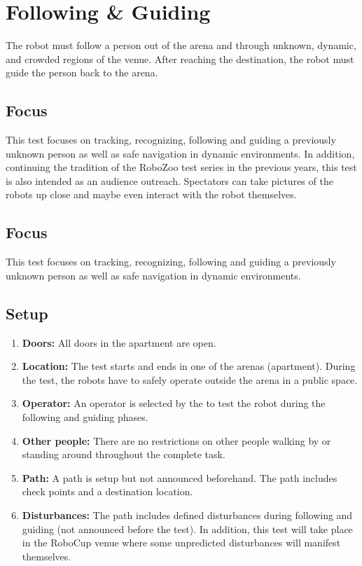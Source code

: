 \section{Following \& Guiding}

The robot must follow a person out of the arena and through unknown, dynamic, and crowded regions of the venue. 
After reaching the destination, the robot must guide the person back to the arena.

\subsection{Focus}
This test focuses on tracking, recognizing, following and guiding a previously unknown person as well as safe navigation in dynamic environments.
In addition, continuing the tradition of the RoboZoo test series in the previous years, this test is also intended as an audience outreach.
Spectators can take pictures of the robots up close and maybe even interact with the robot themselves. 

\subsection{Focus}
This test focuses on tracking, recognizing, following and guiding a previously unknown person as well as safe navigation in dynamic environments.

\subsection{Setup}

\begin{enumerate}
\item \textbf{Doors:} All doors in the apartment are open.
\item \textbf{Location:} The test starts and ends in one of the arenas (apartment). During the test, the robots have to safely operate outside the arena in a public space.
\item \textbf{Operator:} An operator is selected by the \TC to test the robot during the following and guiding phases.
\item \textbf{Other people:} There are no restrictions on other people walking by or standing around throughout the complete task.
\item \textbf{Path:} A path is setup but not announced beforehand. 
The path includes check points and a destination location.
\item \textbf{Disturbances:} The path includes defined disturbances during following and guiding (not announced before the test).
In addition, this test will take place in the RoboCup venue where some unpredicted disturbances will manifest themselves. 
\end{enumerate}

